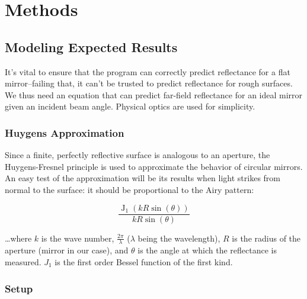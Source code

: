 \documentclass[etd,twoside,senior,noacknowledgments]{BYUPhys}
\DeclareMathOperator{\J}{J}
\begin{document}






\chapter{Methods} \label{chap:methods}

\section{Modeling Expected Results} \label{sec:expected_results}

It's vital to ensure that the program can correctly predict reflectance for a flat mirror--failing that, it can't be trusted to predict reflectance for rough surfaces. We thus need an equation that can predict far-field reflectance for an ideal mirror given an incident beam angle. Physical optics are used for simplicity.

\subsection{Huygens Approximation} \label{subsec:huygens_approx}

Since a finite, perfectly reflective surface is analogous to an aperture, the Huygens-Fresnel principle is used to approximate the behavior of circular mirrors. An easy test of the approximation will be its results when light strikes from normal to the surface: it should be proportional to the Airy pattern:

\begin{equation}\label{eq:airy}
  \frac{\J_1(kR\sin(\theta))}{kR\sin(\theta)}
\end{equation}

\ldots where $k$ is the wave number, $\frac{2\pi}{\lambda}$ ($\lambda$ being the wavelength), $R$ is the radius of the aperture (mirror in our case), and $\theta$ is the angle at which the reflectance is measured. $J_1$ is the first order Bessel function of the first kind.

\subsection{Setup} \label{sec:setup}
\end{document}
